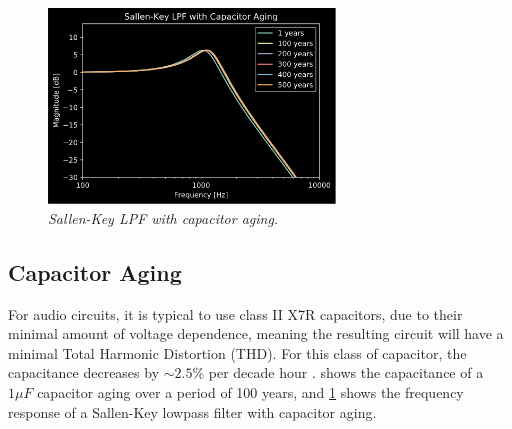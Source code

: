\documentclass[twoside,a4paper]{article}
\begin{document}
%
\begin{figure}[h]
    \center
    \includegraphics[width=3in]{../CMAging/Pics/cap_freq.png}
    \caption{\label{cap-age-freq}{\it Sallen-Key LPF with capacitor aging.}}
\end{figure}
%
\subsection{Capacitor Aging} \label{sec:cap-age}
%
For audio circuits, it is typical to use class II X7R capacitors, due to
their minimal amount of voltage dependence, meaning the resulting circuit
will have a minimal Total Harmonic Distortion (THD). For this class of
capacitor, the capacitance decreases by $\sim2.5\%$ per decade hour
\cite{cap-aging}.  shows the capacitance of a $1 \mu F$
capacitor aging over a period of 100 years, and \cref{cap-age-freq} shows
the frequency response of a Sallen-Key lowpass filter with capacitor
aging.
%
\end{document}
